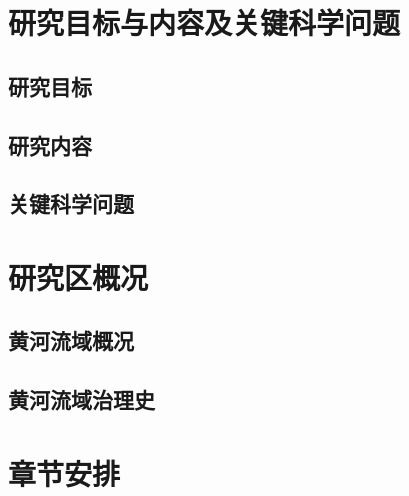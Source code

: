 \section{研究目标与内容及关键科学问题}
\label{sec:scientific_question}

\subsection{研究目标}
\subsection{研究内容}
\subsection{关键科学问题}

\section{研究区概况}
\label{sec:study_area}

\subsection{黄河流域概况}
\subsection{黄河流域治理史}

\section{章节安排}
\label{sec:chapters_summary}